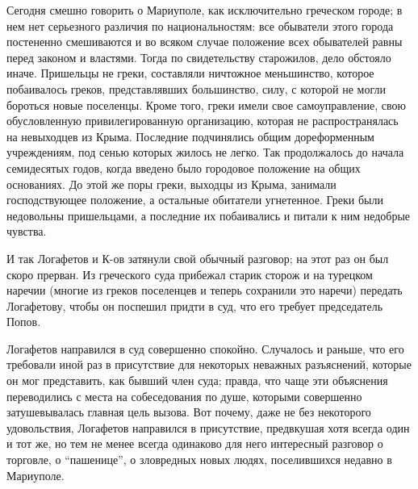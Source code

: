 \documentclass[a4paper,20pt]{report}
\begin{document}
Сегодня смешно говорить о Мариуполе, как исключительно греческом городе; в нем
нет серьезного различия по национальностям: все обыватели этого города
постененно смешиваются и во всяком случае положение всех обывателей равны перед
законом и властями. Тогда по свидетельству старожилов, дело обстояло иначе.
Пришельцы не греки, составляли ничтожное меньшинство, которое побаивалось
греков, представлявших большинство, силу, с которой не могли бороться новые
поселенцы. Кроме того, греки имели свое самоуправление, свою обусловленную
привилегированную организацию, которая не распространялась на невыходцев из
Крыма. Последние подчинялись общим дореформенным учреждениям, под сенью которых
жилось не легко. Так продолжалось до начала семидесятых годов, когда введено
было городовое положение на общих основаниях. До этой же поры греки, выходцы из
Крыма, занимали господствующее положение, а остальные обитатели угнетенное.
Греки были недовольны пришельцами, а последние их побаивались и питали к ним
недобрые чувства.

И так Логафетов и К-ов затянули свой обычный разговор; на этот раз он был скоро
прерван. Из греческого суда прибежал старик сторож и на турецком наречии
(многие из греков поселенцев и теперь сохранили это наречи) передать
Логафетову, чтобы он поспешил придти в суд, что его требует председатель Попов.

Логафетов направился в суд совершенно спокойно.
Случалось и раньше, что его требовали иной раз в присутствие
для некоторых неважных разъяснений, которые он мог представить, как бывший член суда;
правда, что чаще эти объяснения переводились с места на собеседования по душе, которыми совершенно
затушевывалась главная цель вызова. Вот почему, даже не без некоторого удовольствия, Логафетов направился 
в присутствие, предвкушая хотя всегда один и тот же, но тем не менее всегда
одинаково для него интересный разговор о торговле, о ``пашенице'', о зловредных
новых людях, поселившихся недавно в Мариуполе.
\end{document}
